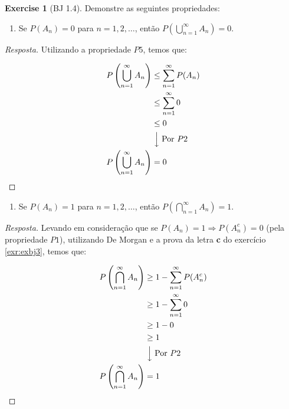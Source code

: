 \documentclass[
]{article}
\providecommand{\tightlist}{%
  \setlength{\itemsep}{0pt}\setlength{\parskip}{0pt}}
\theoremstyle{definition}
\theoremstyle{definition}
\theoremstyle{definition}
\newtheorem{exercise}{Exercise}[section]
\theoremstyle{definition}
\theoremstyle{remark}
\begin{document}
\begin{exercise}[BJ 1.4]

Demonstre as seguintes propriedades:

\begin{enumerate}
\def\labelenumi{\alph{enumi})}
\tightlist
\item
  Se \(P(A_{n}) = 0\) para \(n = 1,2,\dots\), então \(P\left(\bigcup_{n=1}^{\infty}A_{n}\right) = 0\).
\end{enumerate}

\begin{proof}[Resposta]
Utilizando a propriedade \(P5\), temos que:

\begin{align*}
P\left(\bigcup_{n=1}^{\infty} A_{n}\right) &\le \sum_{n=1}^{\infty}P(A_{n}) \\
&\le \sum_{n=1}^{\infty}0 \\
&\le 0 \\
&\;\Big\downarrow \;\text{Por } P2\\
P\left(\bigcup_{n=1}^{\infty} A_{n}\right) &= 0
\end{align*}
\end{proof}

\begin{enumerate}
\def\labelenumi{\alph{enumi})}
\setcounter{enumi}{1}
\tightlist
\item
  Se \(P(A_{n}) = 1\) para \(n = 1,2,\dots\), então \(P\left(\bigcap_{n=1}^{\infty}A_{n}\right) = 1\).
\end{enumerate}

\begin{proof}[Resposta]
Levando em consideração que se \(P(A_{n}) = 1 \Rightarrow P(A_{n}^{c}) = 0\) (pela propriedade \(P1\)), utilizando De Morgan e a prova da letra \textbf{c} do exercício \ref{exr:exbj3}, temos que:

\begin{align*}
P\left(\bigcap_{n=1}^{\infty}A_{n}\right) &\ge 1 - \sum_{n=1}^{\infty} P(A_{n}^{c}) \\
&\ge 1 - \sum_{n=1}^{\infty}0 \\
&\ge 1 - 0 \\
&\ge 1 \\
&\;\Big\downarrow \;\text{Por } P2\\
P\left(\bigcap_{n=1}^{\infty}A_{n}\right) &= 1
\end{align*}
\end{proof}

\end{exercise}
\end{document}
